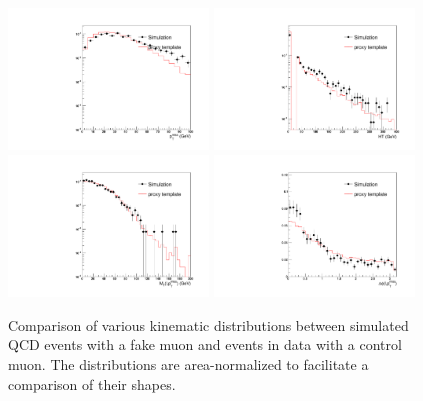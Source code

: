 \documentclass[thesis.tex]{subfiles}
\renewcommand\_{\textunderscore\allowbreak}
\begin{document}
\begin{figure}[hbtp]\begin{center}
    \includegraphics[width=0.475\textwidth]{Figures/faketemp_muon_met.pdf}
    \includegraphics[width=0.475\textwidth]{Figures/faketemp_muon_ht.pdf}
    \includegraphics[width=0.475\textwidth]{Figures/faketemp_muon_mt.pdf}
    \includegraphics[width=0.475\textwidth]{Figures/faketemp_muon_dPhi.pdf}
    \caption{Comparison of various kinematic distributions between simulated
        QCD events with a fake muon and events in data with a control muon. The
        distributions are area-normalized to facilitate a comparison of their
        shapes.}
        \label{fig:c_muon}
\end{center}\end{figure}
\end{document}
